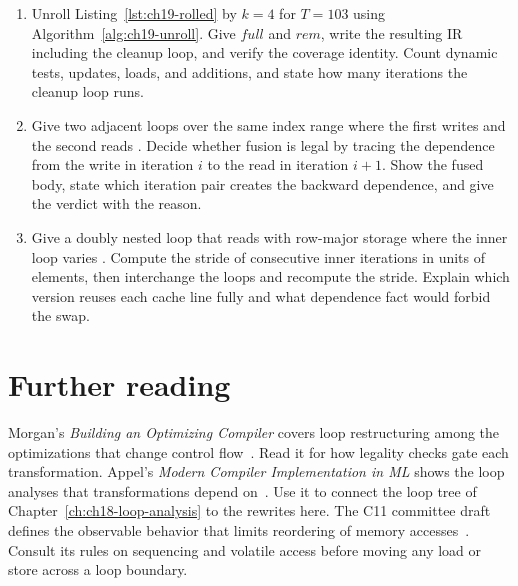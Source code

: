 \begin{enumerate}
  \item \label{ex:ch19-remainder}
  Unroll Listing~\ref{lst:ch19-rolled} by $k = 4$ for $T = 103$ using Algorithm~\ref{alg:ch19-unroll}.
  Give $full$ and $rem$, write the resulting IR including the cleanup loop, and verify the coverage identity.
  Count dynamic tests, updates, loads, and additions, and state how many iterations the cleanup loop runs.
  \item \label{ex:ch19-fusion-check}
  Give two adjacent loops over the same index range where the first writes  and the second reads .
  Decide whether fusion is legal by tracing the dependence from the write in iteration $i$ to the read in iteration $i+1$.
  Show the fused body, state which iteration pair creates the backward dependence, and give the verdict with the reason.
  \item \label{ex:ch19-interchange-win}
  Give a doubly nested loop that reads  with row-major storage where the inner loop varies .
  Compute the stride of consecutive inner iterations in units of elements, then interchange the loops and recompute the stride.
  Explain which version reuses each cache line fully and what dependence fact would forbid the swap.
\end{enumerate}

\section{Further reading}
\label{sec:ch19-further-reading}

Morgan's \emph{Building an Optimizing Compiler} covers loop restructuring among the optimizations that change control flow~\cite{morgan-1998-optimizing}.
Read it for how legality checks gate each transformation.
Appel's \emph{Modern Compiler Implementation in ML} shows the loop analyses that transformations depend on~\cite{appel-1998-modern}.
Use it to connect the loop tree of Chapter~\ref{ch:ch18-loop-analysis} to the rewrites here.
The C11 committee draft defines the observable behavior that limits reordering of memory accesses~\cite{wg14-2011-c11}.
Consult its rules on sequencing and volatile access before moving any load or store across a loop boundary.
